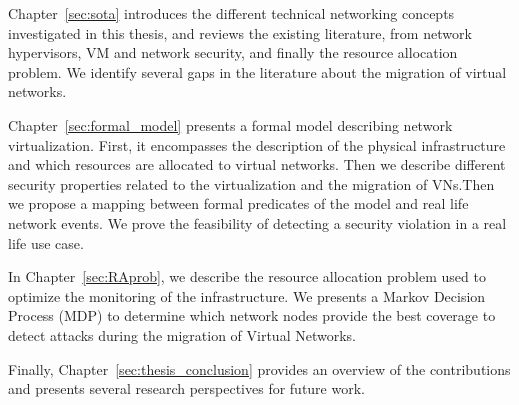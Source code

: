 Chapter~\ref{sec:sota} introduces the different technical networking concepts investigated in this thesis, and reviews the existing literature, from network hypervisors, VM and network security, and finally the resource allocation problem. We identify several gaps in the literature about the migration of virtual networks.

Chapter~\ref{sec:formal_model} presents a formal model describing network virtualization. 
First, it encompasses the description of the physical infrastructure and which resources are allocated to virtual networks. Then we describe different security properties related to the virtualization and the migration of VNs.Then we propose a mapping between formal predicates of the model and real life network events. We prove the feasibility of detecting a security violation in a real life use case.

In Chapter~\ref{sec:RAprob}, we describe  the resource allocation problem used to optimize the monitoring of the infrastructure.
We presents a Markov Decision Process (MDP) to determine which network nodes provide the best coverage to detect attacks during the migration of Virtual Networks.

Finally, Chapter~\ref{sec:thesis_conclusion} provides an overview of the contributions and presents several research perspectives for future work.
